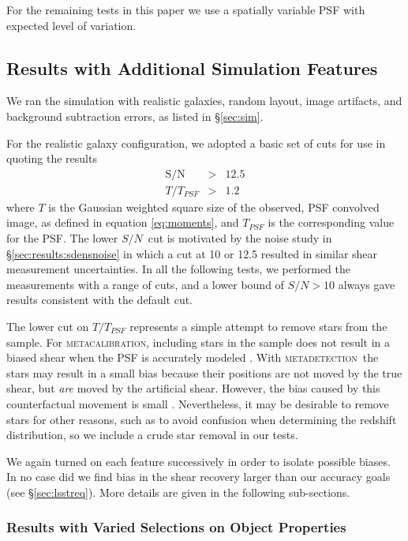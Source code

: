 \documentclass[twocolumn,twocolappendix,astrosym]{openjournal}
\newcommand{\snr}{$S/N$}
\newcommand{\mcal}{\textsc{metacalibration}}
\newcommand{\mdet}{\textsc{metadetection}}
\begin{document}
For the remaining tests in this paper we use a spatially variable PSF with
expected level of variation.

\subsection{Results with Additional Simulation Features} \label{sec:results:more}

We ran the simulation with realistic galaxies, random layout, image
artifacts, and background subtraction errors, as listed in \S \ref{sec:sim}.

For the realistic galaxy configuration, we adopted a basic set of cuts for use
in quoting the results
\begin{eqnarray} \label{eq:basiccuts}
    \mathrm{S/N} & > & 12.5 \\
    T/T_{PSF} & > & 1.2
\end{eqnarray}
where $T$ is the Gaussian weighted square size of the observed, PSF convolved
image, as defined in equation \ref{eq:moments}, and $T_{PSF}$ is the
corresponding value for the PSF.  The lower \snr\ cut is motivated by the noise
study in \S \ref{sec:results:sdensnoise} in which a cut at 10 or 12.5 resulted
in similar shear measurement uncertainties.  In all the following tests, we performed
the measurements with a range of cuts, and a lower bound of $S/N > 10$ always
gave results consistent with the default cut.

The lower cut on $T/T_{PSF}$ represents a simple attempt to remove stars from
the sample.  For \mcal, including stars in the sample does not result in a
biased shear when the PSF is accurately modeled \citep{SheldonMcal2017}.  With
\mdet\ the stars may result in a small bias because their positions are not
moved by the true shear, but {\it are} moved by the artificial shear. However,
the bias caused by this counterfactual movement is small \citep{mdet20}.
Nevertheless, it may be desirable to remove stars for other reasons, such as to
avoid confusion when determining the redshift distribution, so we include a
crude star removal in our tests.

We again turned on each feature successively in order to isolate possible
biases.  In no case did we find bias in the shear recovery larger than our
accuracy goals (see \S \ref{sec:lsstreq}).  More details are given in the
following sub-sections.

\subsubsection{Results with Varied Selections on Object Properties} \label{sec:results:select}
\end{document}
